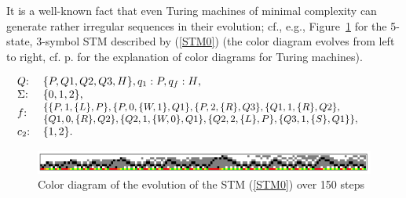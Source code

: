 \documentclass[%
  manuscript=article,   %
  year=2024,
  volume=77,
  doi=00000.000,
]{zfn}
\begin{document}
It is a well-known fact that even Turing machines of minimal complexity can generate rather irregular sequences in their evolution; cf., e.g., Figure~\ref{messy} for the 5-state, 3-symbol STM described by (\ref{STM0}) (the color diagram evolves from left to right, cf. p. \pageref{colordia} for the explanation of color diagrams for Turing machines).

\begin{table}[!ht]
\begin{eqnarray}
\hspace{-0.5cm}& \begin{tabular}{ll}
$Q$: & $\{P,Q1,Q2,Q3,H\}, q_{1}:P, q_{f}:H$,\\
$\Sigma$: & $\{0,1,2\}$,\\
$f$: & \hspace{-0.2cm}\begin{small}\begin{tabular}{l}$\{\{P,1,\{L\}, P\},\{P,0,\{W,1\},Q1\},\{P,2,\{R\},Q3\},\{Q1,1,\{R\},Q2\},$\\
$\{Q1,0,\{R\},Q2\},\{Q2,1,\{W,0\},Q1\},\{Q2,2,\{L\},P\},\{Q3,1,\{S\},Q1\}\}$,\end{tabular}\end{small}\\
$c_{2}$: & $\{1, 2\}$.
\end{tabular} & \label{STM0}
\end{eqnarray}
\caption{A 5-state, 3-symbol STM inducing the irregular color diagram in Fig.~\ref{messy}}
\end{table}

\begin{figure}[!ht]
    \centering
    \includegraphics[width=12.5cm]{ART_Lampert/messy.png}
\caption{Color diagram of the evolution of the STM (\ref{STM0}) over 150 steps}
    \label{messy}
\end{figure}
\end{document}

